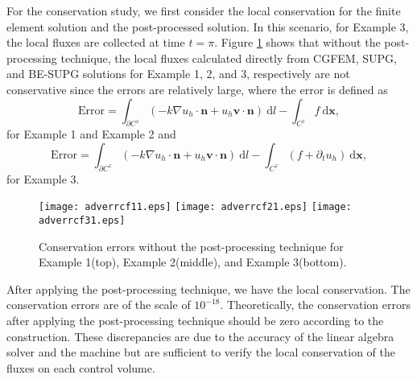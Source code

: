 \documentclass[times]{nlaauth}
\numberwithin{equation}{section}
\begin{document}
For the conservation study, we first consider the local conservation for the finite element solution and the post-processed solution. In this scenario, for Example 3, the local fluxes are collected at time $t=\pi.$
Figure \ref{fig:advncf} shows that without the post-processing technique, the local fluxes calculated directly from CGFEM, SUPG, and BE-SUPG solutions for Example 1, 2, and 3, respectively are not conservative since the errors are relatively large, where the error is defined as
\begin{equation}
\text{Error} = \int_{\partial C^z}  ( - k \nabla u_h \cdot \boldsymbol{n} + u_h \boldsymbol{v} \cdot \boldsymbol{n} ) \ \text{d} l - \int_{C^z} f \ \text{d} \boldsymbol{x},
\end{equation}
for Example 1 and Example 2 and
\begin{equation}
\text{Error} = \int_{\partial C^z}  ( - k \nabla u_h \cdot \boldsymbol{n} + u_h \boldsymbol{v} \cdot \boldsymbol{n} ) \ \text{d} l - \int_{C^z} (f + \partial_t u_h) \ \text{d} \boldsymbol{x},
\end{equation}
for Example 3.

\begin{figure}
\centering
\texttt{[image: adverrcf11.eps]}
\texttt{[image: adverrcf21.eps]}
\texttt{[image: adverrcf31.eps]}
\caption{Conservation errors without the post-processing technique for Example 1(top), Example 2(middle), and Example 3(bottom). }
\label{fig:advncf}
\end{figure}

After applying the post-processing technique, we have the local conservation. The conservation errors are of the scale of $10^{-18}$. Theoretically, the conservation errors after applying the post-processing technique should be zero according to the construction. These discrepancies are due to the accuracy of the linear algebra solver and the machine but are sufficient to verify the local conservation of the fluxes on each control volume.
\end{document}
